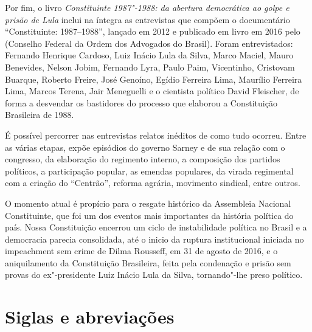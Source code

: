 Por fim, o livro \emph{Constituinte 1987"-1988: da abertura democrática
ao golpe e prisão de Lula} inclui na íntegra as entrevistas
que compõem o documentário ``Constituinte: 1987--1988'', lançado em 2012 e
publicado em livro em 2016 pelo  (Conselho Federal da Ordem dos Advogados do
Brasil). Foram entrevistados: Fernando Henrique Cardoso, Luiz Inácio Lula da Silva, Marco
Maciel, Mauro Benevides, Nelson Jobim, Fernando Lyra, Paulo Paim, Vicentinho, Cristovam Buarque,
Roberto Freire, José Genoíno, Egídio Ferreira Lima, Maurílio Ferreira Lima, Marcos Terena, Jair
Meneguelli e o cientista político David Fleischer, de forma a desvendar os bastidores do
processo que elaborou a Constituição Brasileira de 1988.

É possível percorrer nas entrevistas relatos inéditos de como tudo ocorreu. Entre as várias
etapas, expõe episódios do governo Sarney e de sua relação com o congresso, da elaboração do
regimento interno, a composição dos partidos políticos, a participação popular, as emendas
populares, da virada regimental com a criação do “Centrão”, reforma agrária, movimento sindical,
entre outros.

O momento atual é propício para o resgate histórico da Assembleia Nacional Constituinte, que
foi um dos eventos mais importantes da história política do país. Nossa Constituição encerrou
um ciclo de instabilidade política no Brasil e a democracia parecia consolidada, até o inicio da
ruptura institucional iniciada no impeachment sem crime de Dilma Rousseff, em 31 de agosto de
2016, e o aniquilamento da Constituição Brasileira, feita pela condenação e prisão sem provas
do ex"-presidente Luiz Inácio Lula da Silva, tornando"-lhe preso político.

\pagebreak

\section{Siglas e abreviações}


